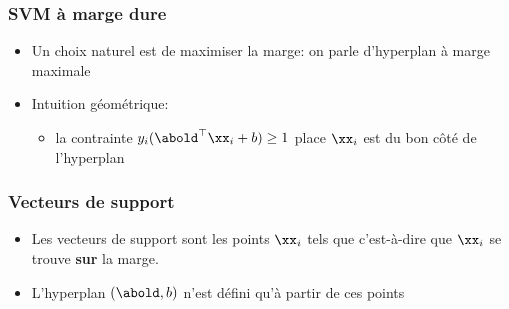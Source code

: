 \documentclass[9pt,table]{beamer} %
\begin{document}
\begin{frame}
\frametitle{SVM à marge dure}

\begin{itemize}[label=\tiny$\blacksquare$]
	\item Un choix naturel est de \alert{maximiser} la marge: on parle d'hyperplan à marge maximale
	
\end{itemize}





\begin{itemize}[label=\tiny$\blacksquare$]
	\item Intuition géométrique: 
	\begin{itemize}[label=-]
		\item la contrainte $y_i(\abold^\top \xx_i + b) \geq 1$ place $\xx_i$ est du bon côté de l'hyperplan
	\end{itemize}
\end{itemize}

\end{frame}



\begin{frame}
\frametitle{Vecteurs de support}

\begin{itemize}[label=\tiny$\blacksquare$]
	\item Les vecteurs de support sont les points $\xx_i$ tels que
	c'est-à-dire que $\xx_i$ se trouve \textbf{sur} la marge.
\end{itemize}

\myfig{
	
	\pause
	
}

\begin{itemize}[label=\tiny$\blacksquare$]
	\item L'hyperplan $(\abold,b)$ n'est défini qu'à partir de ces points
\end{itemize}
\end{frame}
\end{document}

